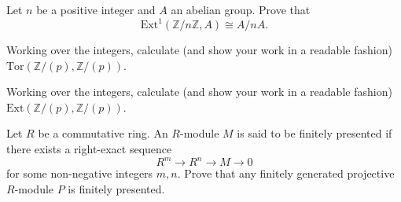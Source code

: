 \begin{prob}[S2018-Q5]
    Let \(n\) be a positive integer and \(A\) an abelian group. Prove that
    \[\text{Ext}^1(\mathbb{Z}/n\mathbb{Z}, A) \cong A/nA.\]
\end{prob}


\begin{prob}[F2002-Q3]
    Working over the integers, calculate (and show your work in a readable fashion) \(\text{Tor}(\mathbb{Z}/(p), \mathbb{Z}/(p))\).
\end{prob}

\begin{prob}[F2002-Q4]
    Working over the integers, calculate (and show your work in a readable fashion) \(\text{Ext}(\mathbb{Z}/(p), \mathbb{Z}/(p))\).
\end{prob}



\begin{prob}[S2018-Q2]
    Let \(R\) be a commutative ring. An \(R\)-module \(M\) is said to be finitely presented if there exists a right-exact sequence
    \[R^m \longrightarrow R^n \longrightarrow M \longrightarrow 0\]
    for some non-negative integers \(m,n\). Prove that any finitely generated projective \(R\)-module \(P\) is finitely presented.
\end{prob}



